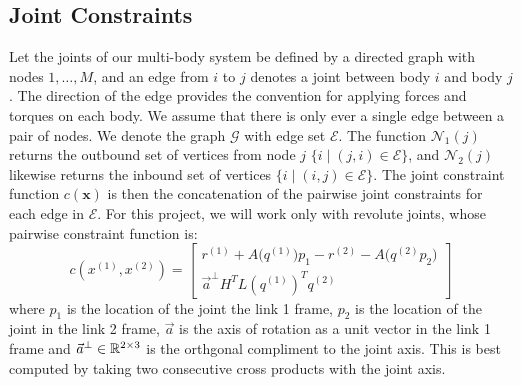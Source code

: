 \documentclass[conference]{IEEEtran}
\begin{document}
\subsection{Joint Constraints}
Let the joints of our multi-body system be defined by a directed graph with nodes $1,\dots,M$,
and an edge from $i$ to $j$ denotes a joint between body $i$ and body $j$. The direction 
of the edge provides the convention for applying forces and torques on each body. We assume 
that there is only ever a single edge between a pair of nodes. We denote the graph 
$\mathcal{G}$ with edge set $\mathcal{E}$. The function $\mathcal{N}_1(j)$ returns the
outbound set of vertices from node $j$ $\{i \mid (j,i) \in \mathcal{E}\}$, 
and $\mathcal{N}_2(j)$ likewise returns the inbound set of vertices 
$\{ i \mid (i,j) \in \mathcal{E}\}$. The joint constraint function $c(\mathbf{x})$ is then 
the concatenation of the pairwise joint constraints for each edge in $\mathcal{E}$. For 
this project, we will work only with revolute joints, whose pairwise constraint function is:
\begin{equation}
    c(x^{(1)}, x^{(2)}) = \begin{bmatrix}
        r^{(1)} + A \big( q^{(1)} \big) p_1 - r^{(2)} - A \big( q^{(2)} p_2 \big) \\
        \vec{a}^\perp H^T L(q^{(1)})^T q^{(2)}
    \end{bmatrix}
\end{equation}
where $p_1$ is the location of the joint the link 1 frame, $p_2$ is the location of the 
joint in the link 2 frame, $\vec{a}$ is the axis of rotation as a unit vector in the 
link 1 frame and $\vec{a}^\perp \in \mathbb{R}^{2 \times 3}$ is the orthgonal compliment to the 
joint axis. This is best computed by taking two consecutive cross products with the joint 
axis. 
\end{document}
